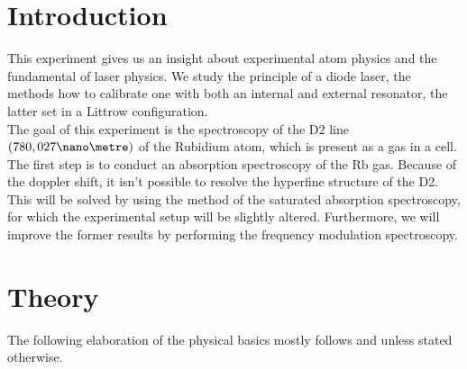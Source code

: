 
\section{Introduction}
This experiment gives us an insight about experimental atom physics and the fundamental of laser physics. We study the principle of a diode laser, the methods how to calibrate one with both an internal and external resonator, the latter set in a Littrow configuration.\\
The goal of this experiment is the spectroscopy of the D2 line $(780,027 \nano\metre)$ of the Rubidium atom, which is present as a gas in a cell.\\
The first step is to conduct an absorption spectroscopy of the Rb gas. Because of the doppler shift, it isn't possible to resolve the hyperfine structure of the D2. This will be solved by using the method of the saturated absorption spectroscopy, for which the experimental setup will be slightly altered. Furthermore, we will improve the former results by performing the frequency modulation spectroscopy.
\section{Theory}
The following elaboration of the physical basics mostly follows \cite{lit:AK_manual2012} and \cite{lit:SAS} unless stated otherwise.

